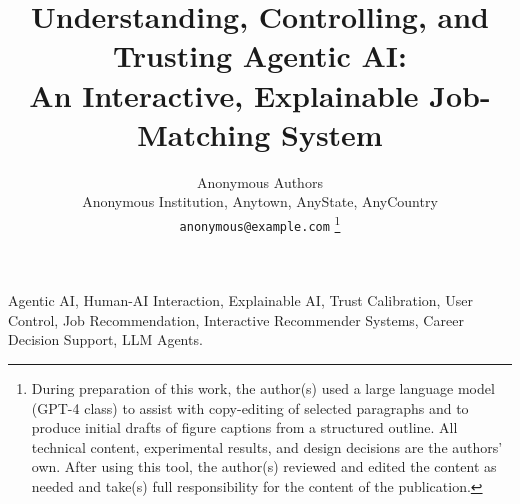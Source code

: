 \documentclass[11pt,a4paper]{article}
\title{Understanding, Controlling, and Trusting Agentic AI:\\
       An Interactive, Explainable Job-Matching System}
\author{Anonymous Authors\\
        Anonymous Institution, Anytown, AnyState, AnyCountry\\
        \texttt{anonymous@example.com}
        \thanks{During preparation of this work, the author(s) used a
          large language model (GPT-4 class) to assist with
          copy-editing of selected paragraphs and to produce initial
          drafts of figure captions from a structured outline. All
          technical content, experimental results, and design
          decisions are the authors' own. After using this tool, the
          author(s) reviewed and edited the content as needed and
          take(s) full responsibility for the content of the
          publication.}}
\begin{document}
\begin{abstract}

\end{abstract}

%

\begin{IEEEkeywords}
Agentic AI, Human-AI Interaction, Explainable AI, Trust Calibration,
User Control, Job Recommendation, Interactive Recommender Systems,
Career Decision Support, LLM Agents.
\end{IEEEkeywords}


\maketitle















\end{document}
